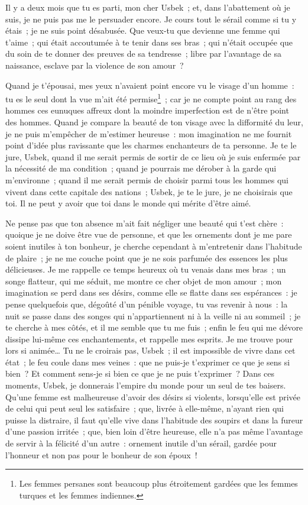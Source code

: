 \documentclass[french,twoside]{book} %
\begin{document}
\noindent Il y a deux mois que tu es parti, mon cher Usbek ; et, dans l’abattement où je suis, je ne puis pas me le persuader encore. Je cours tout le sérail comme si tu y étais ; je ne suis point désabusée. Que veux-tu que devienne une femme qui t’aime ; qui était accoutumée à te tenir dans ses bras ; qui n’était occupée que du soin de te donner des preuves de sa tendresse ; libre par l’avantage de sa naissance, esclave par la violence de son amour ?\par
Quand je t’épousai, mes yeux n’avaient point encore vu le visage d’un homme : tu es le seul dont la vue m’ait été permise\footnote{Les femmes persanes sont beaucoup plus étroitement gardées que les femmes turques et les femmes indiennes.} ; car je ne compte point au rang des hommes ces eunuques affreux dont la moindre imperfection est de n’être point des hommes. Quand je compare la beauté de ton visage avec la difformité du leur, je ne puis m’empêcher de m’estimer heureuse : mon imagination ne me fournit point d’idée plus ravissante que les charmes enchanteurs de ta personne. Je te le jure, Usbek, quand il me serait permis de sortir de ce lieu où je suis enfermée par la nécessité de ma condition ; quand je pourrais me dérober à la garde qui m’environne ; quand il me serait permis de choisir parmi tous les hommes qui vivent dans cette capitale des nations ; Usbek, je te le jure, je ne choisirais que toi. Il ne peut y avoir que toi dans le monde qui mérite d’être aimé.\par
Ne pense pas que ton absence m’ait fait négliger une beauté qui t’est chère : quoique je ne doive être vue de personne, et que les ornements dont je me pare soient inutiles à ton bonheur, je cherche cependant à m’entretenir dans l’habitude de plaire ; je ne me couche point que je ne sois parfumée des essences les plus délicieuses. Je me rappelle ce temps heureux où tu venais dans mes bras ; un songe flatteur, qui me séduit, me montre ce cher objet de mon amour ; mon imagination se perd dans ses désirs, comme elle se flatte dans ses espérances : je pense quelquefois que, dégoûté d’un pénible voyage, tu vas revenir à nous : la nuit se passe dans des songes qui n’appartiennent ni à la veille ni au sommeil ; je te cherche à mes côtés, et il me semble que tu me fuis ; enfin le feu qui me dévore dissipe lui-même ces enchantements, et rappelle mes esprits. Je me trouve pour lors si animée… Tu ne le croirais pas, Usbek ; il est impossible de vivre dans cet état ; le feu coule dans mes veines : que ne puis-je t’exprimer ce que je sens si bien ? Et comment sens-je si bien ce que je ne puis t’exprimer ? Dans ces moments, Usbek, je donnerais l’empire du monde pour un seul de tes baisers. Qu’une femme est malheureuse d’avoir des désirs si violents, lorsqu’elle est privée de celui qui peut seul les satisfaire ; que, livrée à elle-même, n’ayant rien qui puisse la distraire, il faut qu’elle vive dans l’habitude des soupirs et dans la fureur d’une passion irritée ; que, bien loin d’être heureuse, elle n’a pas même l’avantage de servir à la félicité d’un autre : ornement inutile d’un sérail, gardée pour l’honneur et non pas pour le bonheur de son époux !\par
\end{document}
